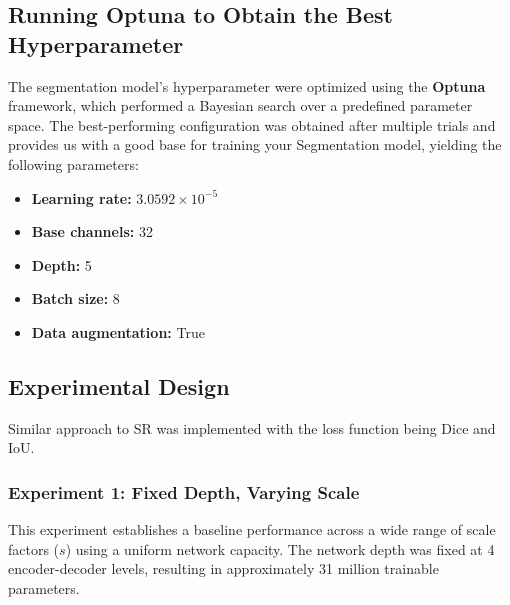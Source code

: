 \subsection{Running Optuna to Obtain the Best Hyperparameter}
\label{subsec:optuna_hyperparams}

The segmentation model’s hyperparameter were optimized using the \textbf{Optuna} framework, which performed a Bayesian search over a predefined parameter space.  
The best-performing configuration was obtained after multiple trials and provides us with a good base for training your Segmentation model, yielding the following parameters:

\begin{itemize}
    \item \textbf{Learning rate:} $3.0592 \times 10^{-5}$
    \item \textbf{Base channels:} 32
    \item \textbf{Depth:} 5
    \item \textbf{Batch size:} 8
    \item \textbf{Data augmentation:} True
\end{itemize}



\subsection{Experimental Design}
\label{subsec:exp_design}

Similar approach to SR was implemented with the loss function being Dice and IoU. 



\subsubsection{Experiment 1: Fixed Depth, Varying Scale} This experiment establishes a baseline performance across a wide range of scale factors ($s$) using a uniform network capacity. The network depth was fixed at 4 encoder-decoder levels, resulting in approximately 31 million trainable parameters.

